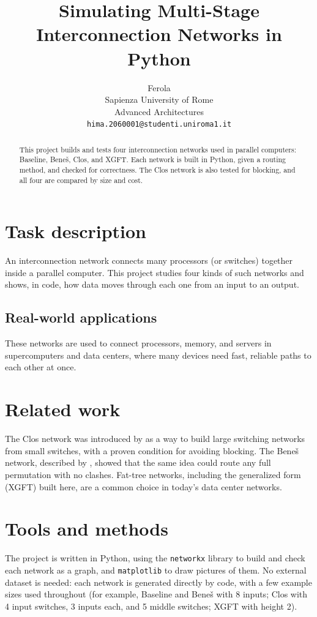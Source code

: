 \documentclass[11pt]{article}
\title{Simulating Multi-Stage Interconnection Networks in Python}
\author{Ferola \\
  Sapienza University of Rome \\
  Advanced Architectures \\
  {\tt hima.2060001@studenti.uniroma1.it} \\}
\date{}
\begin{document}
\maketitle

\begin{abstract}
This project builds and tests four interconnection networks used
in parallel computers: Baseline, Beneš, Clos, and XGFT. Each
network is built in Python, given a routing method, and checked
for correctness. The Clos network is also tested for blocking, and
all four are compared by size and cost.
\end{abstract}

\section{Task description}
An interconnection network connects many processors (or switches)
together inside a parallel computer. This project studies four
kinds of such networks and shows, in code, how data moves through
each one from an input to an output.

\subsection{Real-world applications}
These networks are used to connect processors, memory, and servers
in supercomputers and data centers, where many devices need fast,
reliable paths to each other at once.

\section{Related work}
The Clos network was introduced by \citet{clos1953} as a way to
build large switching networks from small switches, with a proven
condition for avoiding blocking. The Beneš network, described by
\citet{benes1965}, showed that the same idea could route any full
permutation with no clashes. Fat-tree networks, including the
generalized form (XGFT) built here, are a common choice in today's
data center networks.

\section{Tools and methods}
The project is written in Python, using the \texttt{networkx}
library to build and check each network as a graph, and
\texttt{matplotlib} to draw pictures of them. No external dataset
is needed: each network is generated directly by code, with a few
example sizes used throughout (for example, Baseline and Beneš
with 8 inputs; Clos with 4 input switches, 3 inputs each, and 5
middle switches; XGFT with height 2).
\end{document}
